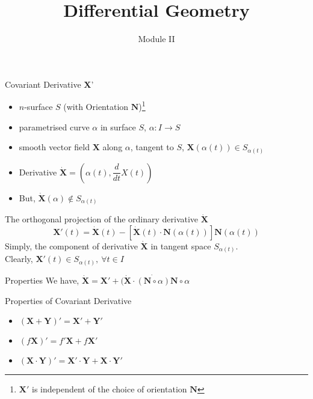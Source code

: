 \documentclass{beamer}
\title{Differential Geometry}
\author{Module II}
\institute{Chapter 8 : Parallel Transport}
\begin{document}
\begin{frame}
\maketitle
\end{frame}

\begin{frame}{Covariant Derivative $\mathbf{X}$'}
\begin{itemize}
	\item $n$-surface $S$ (with Orientation $\mathbf{N}$)\ddag\footnote{$\mathbf{X}'$ is independent of the choice of orientation $\mathbf{N}$}
	\item parametrised curve $\alpha$ in surface $S$, $\alpha : I \to S$
	\item smooth vector field $\mathbf{X}$ along $\alpha$, tangent to $S$, $\mathbf{X}(\alpha(t)) \in S_{\alpha(t)}$
	\item Derivative $\dot{\mathbf{X}} = \left(\alpha(t),\dfrac{d}{dt}X(t)\right)$
	\item But, $\dot{\mathbf{X}}(\alpha) \notin S_{\alpha(t)}$
\end{itemize}
\begin{definition}
	The orthogonal projection of the ordinary derivative $\dot{\mathbf{X}}$\\
	$$\mathbf{X}'(t) = \dot{\mathbf{X}}(t)-\left[ \dot{\mathbf{X}}(t) \cdot \mathbf{N}(\alpha(t)) \right] \mathbf{N}(\alpha(t)) $$
	Simply, the component of derivative $\dot{\mathbf{X}}$ in tangent space $S_{\alpha(t)}$.\\
	Clearly, $\mathbf{X}'(t) \in S_{\alpha(t)},\ \forall t \in I$
\end{definition}
\end{frame}

\begin{frame}{Properties}
	We have, $\dot{\mathbf{X}} = \mathbf{X}'+(\dot{\mathbf{X}} \cdot \dot{(\mathbf{N} \circ \alpha)}\mathbf{N} \circ \alpha$
\begin{block}{Properties of Covariant Derivative}
\begin{itemize}
	\item $(\mathbf{X}+\mathbf{Y})' = \mathbf{X}' + \mathbf{Y}'$
	\item $(f\mathbf{X})' = f'\mathbf{X} + f\mathbf{X}'$
	\item $(\mathbf{X} \cdot \mathbf{Y})' = \mathbf{X}' \cdot \mathbf{Y} + \mathbf{X} \cdot \mathbf{Y}'$
\end{itemize}
\end{block}
\end{frame}
\end{document}
